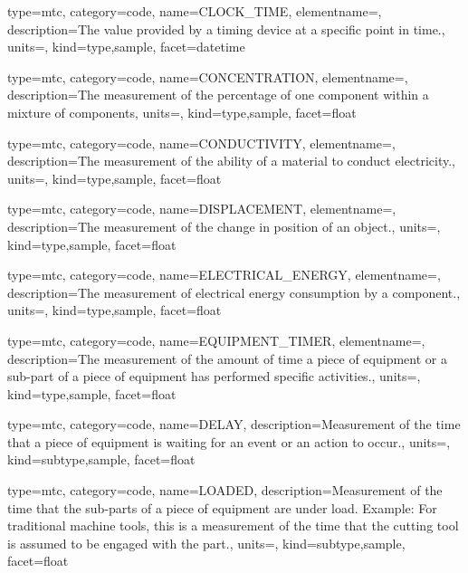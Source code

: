 {
  type=mtc,
  category=code,
  name={CLOCK\_TIME},
  elementname=,
  description={The value provided by a timing device at a specific point in time.},
  units=,
  kind={type,sample},
  facet={\gls{datetime}}
}


{
  type=mtc,
  category=code,
  name={CONCENTRATION},
  elementname=,
  description={The measurement of the percentage of one component within a mixture of components},
  units=,
  kind={type,sample},
  facet={\gls{float}}
}


{
  type=mtc,
  category=code,
  name={CONDUCTIVITY},
  elementname=,
  description={The measurement of the ability of a material to conduct electricity.},
  units=,
  kind={type,sample},
  facet={\gls{float}}
}


{
  type=mtc,
  category=code,
  name={DISPLACEMENT},
  elementname=,
  description={The measurement of the change in position of an object.},
  units=,
  kind={type,sample},
  facet={\gls{float}}
}


{
  type=mtc,
  category=code,
  name={ELECTRICAL\_ENERGY},
  elementname=,
  description={The measurement of electrical energy consumption by a component.},
  units=,
  kind={type,sample},
  facet={\gls{float}}
}


{
  type=mtc,
  category=code,
  name={EQUIPMENT\_TIMER},
  elementname=,
  description={The measurement of the amount of time a piece of equipment or a sub-part of a piece of equipment has performed specific activities.},
  units=,
  kind={type,sample},
  facet={\gls{float}}
}


{
  type=mtc,
  category=code,
  name={DELAY},
  description={Measurement of the time that a piece of equipment is waiting for an event or an action to occur.},
  units=,
  kind={subtype,sample},
  facet={\gls{float}}
}


{
  type=mtc,
  category=code,
  name={LOADED},
  description={Measurement of the time that the sub-parts of a piece of equipment are under load. \newline Example: For traditional machine tools, this is a measurement of the time that the cutting tool is assumed to be engaged with the part.},
  units=,
  kind={subtype,sample},
  facet={\gls{float}}
}


